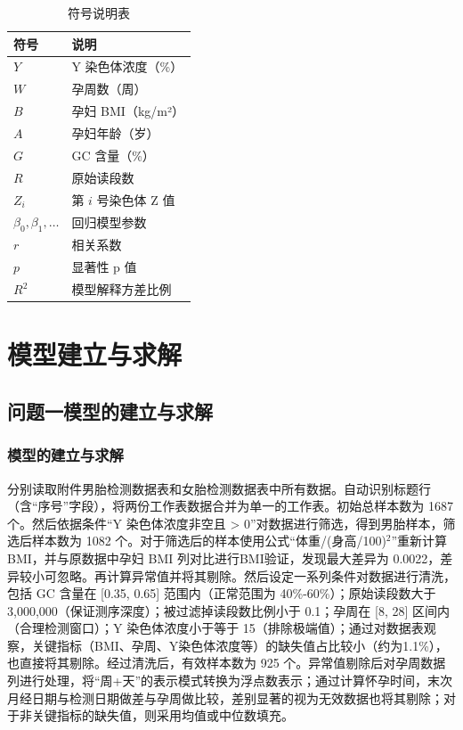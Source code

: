 \documentclass[withoutpreface,bwprint]{cumcmthesis} %
\begin{document}
\begin{table}[h]
    \centering
    \begin{tabular}{ll}
        \toprule
        符号 & 说明 \\
        \midrule
        $Y$ & Y 染色体浓度（\%） \\
        $W$ & 孕周数（周） \\
        $B$ & 孕妇 BMI（kg/m²） \\
        $A$ & 孕妇年龄（岁） \\
        $G$ & GC 含量（\%） \\
        $R$ & 原始读段数 \\
        $Z_i$ & 第 $i$ 号染色体 Z 值 \\
        $\beta_0, \beta_1, \dots$ & 回归模型参数 \\
        $r$ & 相关系数 \\
        $p$ & 显著性 p 值 \\
        $R^2$ & 模型解释方差比例 \\
        \bottomrule
    \end{tabular}
    \caption{符号说明表}
    \label{tab:symbols}
\end{table}

\section{模型建立与求解}
\subsection{问题一模型的建立与求解}
\subsubsection{模型的建立与求解}
分别读取附件男胎检测数据表和女胎检测数据表中所有数据。自动识别标题行（含“序号”字段），将两份工作表数据合并为单一的工作表。初始总样本数为 1687个。然后依据条件“Y 染色体浓度非空且 > 0”对数据进行筛选，得到男胎样本，筛选后样本数为 1082 个。对于筛选后的样本使用公式“体重/(身高/100)$^2$”重新计算 BMI，并与原数据中孕妇 BMI 列对比进行BMI验证，发现最大差异为 0.0022，差异较小可忽略。再计算异常值并将其剔除。然后设定一系列条件对数据进行清洗，包括 GC 含量在 [0.35, 0.65] 范围内（正常范围为 40\%-60\%）；原始读段数大于 3,000,000（保证测序深度）；被过滤掉读段数比例小于 0.1；孕周在 [8, 28] 区间内（合理检测窗口）；Y 染色体浓度小于等于 15（排除极端值）；通过对数据表观察，关键指标（BMI、孕周、Y染色体浓度等）的缺失值占比较小（约为1.1\%），也直接将其剔除。经过清洗后，有效样本数为 925 个。异常值剔除后对孕周数据列进行处理，将“周+天”的表示模式转换为浮点数表示；通过计算怀孕时间，末次月经日期与检测日期做差与孕周做比较，差别显著的视为无效数据也将其剔除；对于非关键指标的缺失值，则采用均值或中位数填充。
\end{document}
